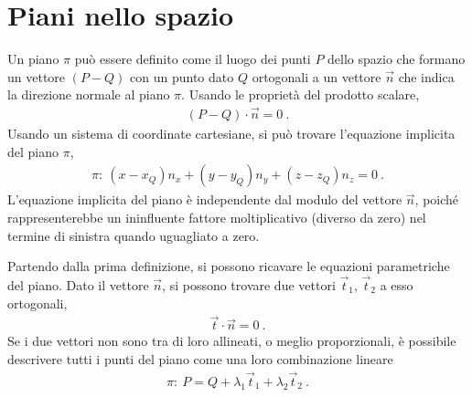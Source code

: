 \documentclass[letterpaper,10pt,english]{jupyterBook}
\begin{document}
\section{Piani nello spazio}
\label{\detokenize{ch/analytic_geometry/analytic_geometry_3d/planes:piani-nello-spazio}}\label{\detokenize{ch/analytic_geometry/analytic_geometry_3d/planes:geometry-analytic-3d-planes}}\label{\detokenize{ch/analytic_geometry/analytic_geometry_3d/planes::doc}}
\sphinxAtStartPar
Un piano \(\pi\) può essere definito come il luogo dei punti \(P\) dello spazio che formano un vettore \((P-Q)\) con un punto dato \(Q\) ortogonali a un vettore \(\overrightarrow{n}\) che indica la direzione normale al piano \(\pi\). Usando le proprietà del prodotto scalare,
\begin{equation*}
\begin{split}(P-Q) \cdot \overrightarrow{n} = 0 \ .\end{split}
\end{equation*}
\sphinxAtStartPar
Usando un sistema di coordinate cartesiane, si può trovare l’equazione implicita del piano \(\pi\),
\begin{equation*}
\begin{split}\pi: \ (x - x_Q) n_x + (y - y_Q) n_y + (z - z_Q) n_z = 0 \ .\end{split}
\end{equation*}
\sphinxAtStartPar
{} L’equazione implicita del piano è independente dal modulo del vettore \(\vec{n}\), poiché rappresenterebbe un ininfluente fattore moltiplicativo (diverso da zero) nel termine di sinistra quando uguagliato a zero.

\sphinxAtStartPar
Partendo dalla prima definizione, si possono ricavare le equazioni parametriche del piano. Dato il vettore \(\vec{n}\), si possono trovare due vettori \(\vec{t}_1\), \(\vec{t}_2\) a esso ortogonali,
\begin{equation*}
\begin{split}\vec{t} \cdot \vec{n} = 0 \ .\end{split}
\end{equation*}
\sphinxAtStartPar
Se i due vettori non sono tra di loro allineati, o meglio proporzionali, è possibile descrivere tutti i punti del piano come una loro combinazione lineare
\begin{equation*}
\begin{split}\pi: \ P = Q + \lambda_1 \vec{t}_1 + \lambda_2 \vec{t}_2 \ .\end{split}
\end{equation*}
\end{document}
